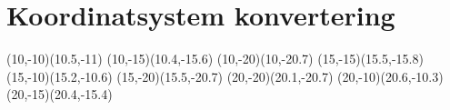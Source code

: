 \chapter{Koordinatsystem konvertering}\label{app:KoordinatsystemKonvertering}
(10,-10)(10.5,-11)
(10,-15)(10.4,-15.6)
(10,-20)(10,-20.7)
(15,-15)(15.5,-15.8)
(15,-10)(15.2,-10.6)
(15,-20)(15.5,-20.7)
(20,-20)(20.1,-20.7)
(20,-10)(20.6,-10.3)
(20,-15)(20.4,-15.4)


